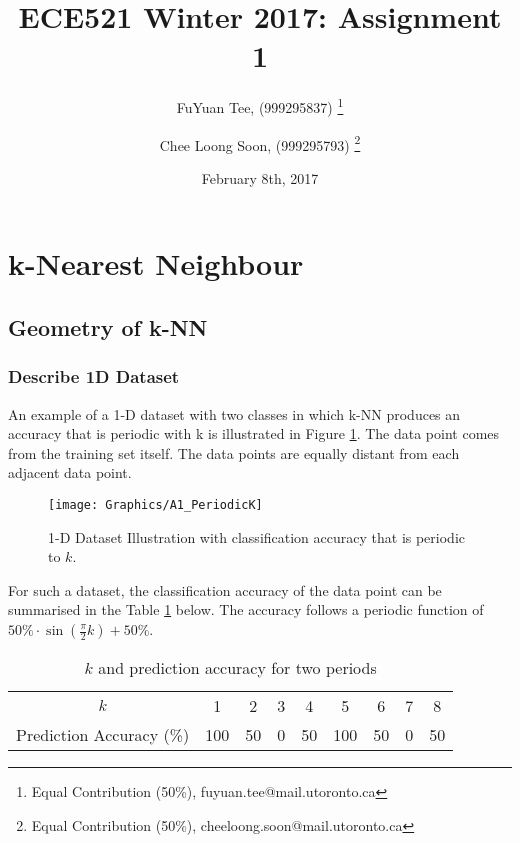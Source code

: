 \documentclass[a4paper,12pt]{article}
\title{ECE521 Winter 2017: Assignment 1}
\author{FuYuan Tee, (999295837)
  \thanks{Equal Contribution (50\%), fuyuan.tee@mail.utoronto.ca}
\and Chee Loong Soon, (999295793) \thanks{Equal Contribution (50\%),  cheeloong.soon@mail.utoronto.ca}}
\date{February 8th, 2017}
\begin{document}
\maketitle
\tableofcontents
\clearpage
\section{k-Nearest Neighbour}
\subsection{Geometry of k-NN}
\subsubsection{Describe 1D Dataset}
An example of a 1-D dataset with two classes in which k-NN produces an accuracy that is periodic with k is illustrated in Figure \ref{figure:periodicK}. The data point comes from the training set itself. The data points are equally distant from each adjacent data point. 

\begin{figure}[!htb]
	\centering
	\texttt{[image: Graphics/A1\_PeriodicK]}
    \caption{\label{figure:periodicK} 1-D Dataset Illustration with classification accuracy that is periodic to $k$.}
\end{figure}

For such a dataset, the classification accuracy of the data point can be summarised in the Table \ref{table:kAccuracy} below. The accuracy follows a periodic function of $50 \% \cdot \sin \left(\frac{\pi}{2} k \right) + 50 \%$.

\begin{table}[ht]
\centering %
\caption{$k$ and prediction accuracy for two periods}
\label{table:kAccuracy}
\begin{tabular}{c c c c c c c c c} %
\hline %
$k$ & 1 & 2 & 3 & 4 & 5 & 6 & 7 & 8 \\ [0.5ex] 
Prediction Accuracy (\%) & 100 & 50 & 0 & 50 & 100 & 50 & 0 & 50 \\ [1ex] %
\hline
\end{tabular}
\end{table}
\clearpage
\end{document}
